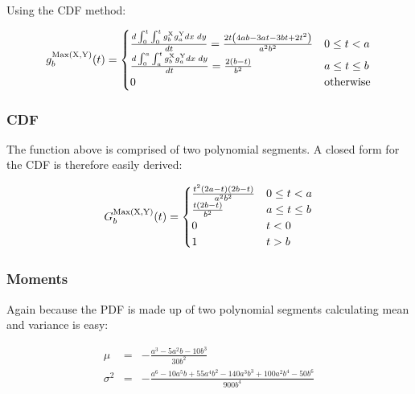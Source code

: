 Using the CDF method: 

\begin{equation}
 g^{\rm Max( X, Y)}_b(t) =
 \begin{cases}
 \frac {d  \int_{0}^{t} \int_{0}^{t}  g^{\rm X}_b g^{\rm Y}_a  dx\; dy }{dt} = \frac{2 t \left(4 a b-3 a t-3 b t+2 t^2\right)}{a^2 b^2} & 0 \le t < a \\ 
 \frac {d  \int_{0}^{a} \int_{a}^{t}  g^{\rm X}_b g^{\rm Y}_a  dx\; dy }{dt} = \frac{2 (b-t)}{b^2}& a \le t  \le b \\ 
 0 & \mbox{otherwise}
 \end{cases}
\end{equation}




\subsubsection{CDF}

The function above is comprised of two polynomial segments. A
closed form for the CDF is therefore easily derived:

\begin{equation}
 G^{\rm Max( X, Y)}_b(t) =
 \begin{cases}
 \frac{t^2 (2 a-t) (2 b-t)}{a^2 b^2} & 0 \le t < a \\ 
 \frac{t (2 b-t)}{b^2} & a \le t  \le b \\ 
 0 & t < 0\\
 1 & t > b
 \end{cases}
\end{equation}




\subsubsection{Moments}

Again because the PDF is made up of two polynomial segments calculating mean and variance is easy:

\begin{eqnarray}
 \mu &= &-\frac{a^3-5 a^2 b-10 b^3}{30 b^2}\\
 \sigma^{2} & = & -\frac{a^6-10 a^5 b+55 a^4 b^2-140 a^3 b^3+100 a^2 b^4-50 b^6}{900 b^4}
\end{eqnarray}






